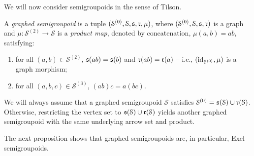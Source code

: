 We will now consider semigroupoids in the sense of Tilson.

\begin{definition}[{\cite[p.\ 194]{MR915990}}]\label{def:graphedsemigroupoid}
A \emph{graphed semigroupoid} is a tuple $(\mathcal{S}^{(0)},\mathcal{S},\operatorname{\mathfrak{s}},\operatorname{\mathfrak{r}},\mu)$, where $(\mathcal{S}^{(0)},\mathcal{S},\operatorname{\mathfrak{s}},\operatorname{\mathfrak{r}})$ is a graph and $\mu\colon\mathcal{S}^{(2)}\to\mathcal{S}$ is a \emph{product map}, denoted by concatenation, $\mu(a,b)=ab$, satisfying:
\begin{enumerate}[label=(\roman*)]
    \item\label{def:graphedsemigroupoiditem1} for all $(a,b)\in \mathcal{S}^{(2)}$, $\operatorname{\mathfrak{s}}(ab)=\operatorname{\mathfrak{s}}(b)$ and $\operatorname{\mathfrak{r}}(ab)=\operatorname{\mathfrak{r}}(a)$ -- i.e., $(\operatorname{id}_{\mathcal{S}^{(0)}},\mu)$ is a graph morphism;
    \item\label{def:graphedsemigroupoiditem2} for all $(a,b,c)\in \mathcal{S}^{(3)}$, $(ab)c=a(bc)$.
\end{enumerate}
We will always assume that a graphed semigroupoid $\mathcal{S}$ satisfies $\mathcal{S}^{(0)}=\operatorname{\mathfrak{s}}(\mathcal{S})\cup\operatorname{\mathfrak{r}}(\mathcal{S})$. Otherwise, restricting the vertex set to $\operatorname{\mathfrak{s}}(\mathcal{S})\cup\operatorname{\mathfrak{r}}(\mathcal{S})$ yields another graphed semigroupoid with the same underlying arrow set and product.
\end{definition}

The next proposition shows that graphed semigroupoids are, in particular, Exel semigroupoids.

